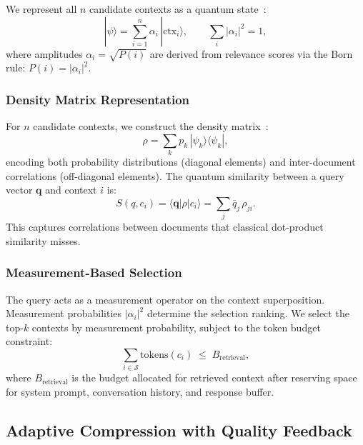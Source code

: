 \documentclass[11pt,letterpaper]{article}
\newcommand{\abs}[1]{\left|#1\right|}
\newcommand{\ket}[1]{|#1\rangle}
\newcommand{\bra}[1]{\langle #1|}
\begin{document}
We represent all $n$ candidate contexts as a quantum
state~\citep{vanrijsbergen2004}:
\begin{equation}
  \ket{\psi} = \sum_{i=1}^{n} \alpha_i\, \ket{\mathrm{ctx}_i},
  \qquad
  \sum_{i} \abs{\alpha_i}^{2} = 1,
  \label{eq:superposition}
\end{equation}
where amplitudes $\alpha_i = \sqrt{P(i)}$ are derived from relevance scores
via the Born rule: $P(i) = \abs{\alpha_i}^{2}$.

\subsubsection{Density Matrix Representation}

For $n$ candidate contexts, we construct the density
matrix~\citep{zuccon2009}:
\begin{equation}
  \rho = \sum_{k} p_k\, \ket{\psi_k}\bra{\psi_k},
  \label{eq:density}
\end{equation}
encoding both probability distributions (diagonal elements) and
inter-document correlations (off-diagonal elements).  The quantum
similarity between a query vector $\mathbf{q}$ and context $i$ is:
\begin{equation}
  S(q, c_i) = \bra{\mathbf{q}}\rho\ket{c_i}
            = \sum_{j} \bar{q}_j\, \rho_{ji}.
  \label{eq:qsim}
\end{equation}
This captures correlations between documents that classical dot-product
similarity misses.

\subsubsection{Measurement-Based Selection}

The query acts as a measurement operator on the context superposition.
Measurement probabilities $\abs{\alpha_i}^{2}$ determine the selection
ranking.  We select the top-$k$ contexts by measurement probability,
subject to the token budget constraint:
\begin{equation}
  \sum_{i \in \mathcal{S}}
    \mathrm{tokens}(c_i) \;\leq\; B_{\mathrm{retrieval}},
  \label{eq:budget-constraint}
\end{equation}
where $B_{\mathrm{retrieval}}$ is the budget allocated for retrieved
context after reserving space for system prompt, conversation history,
and response buffer.

\subsection{Adaptive Compression with Quality Feedback}
\label{sec:compression}
\end{document}
